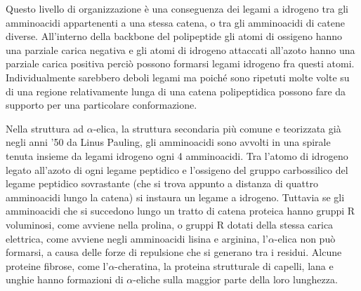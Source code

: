{Questo livello di organizzazione è una conseguenza dei legami a idrogeno tra gli amminoacidi appartenenti a una stessa catena, o tra gli amminoacidi di catene diverse.  All'interno della backbone del polipeptide gli atomi di ossigeno hanno una parziale carica negativa e gli atomi di idrogeno attaccati all'azoto hanno una parziale carica positiva perciò possono formarsi legami idrogeno fra questi atomi. Individualmente sarebbero deboli legami ma poiché sono ripetuti molte volte su di una regione relativamente lunga di una catena polipeptidica possono fare da supporto per una particolare conformazione.

\par Nella struttura ad $\alpha$-elica, la struttura secondaria più comune e teorizzata già negli anni '50 da Linus Pauling, gli amminoacidi sono avvolti in una spirale tenuta insieme da legami idrogeno ogni 4 amminoacidi. Tra l’atomo di idrogeno legato all’azoto di ogni legame peptidico e l’ossigeno del gruppo carbossilico del legame peptidico sovrastante (che si trova appunto a distanza di quattro amminoacidi lungo la catena) si instaura un legame a idrogeno. Tuttavia se gli amminoacidi che si succedono lungo un tratto di catena proteica hanno gruppi R voluminosi, come avviene nella prolina, o gruppi R dotati della stessa carica elettrica, come avviene negli amminoacidi lisina e arginina, l’$\alpha$-elica non può formarsi, a causa delle forze di repulsione che si generano tra i residui. Alcune proteine fibrose, come l'$\alpha$-cheratina, la proteina strutturale di capelli, lana e unghie hanno formazioni di $\alpha$-eliche sulla maggior parte della loro lunghezza.

}
